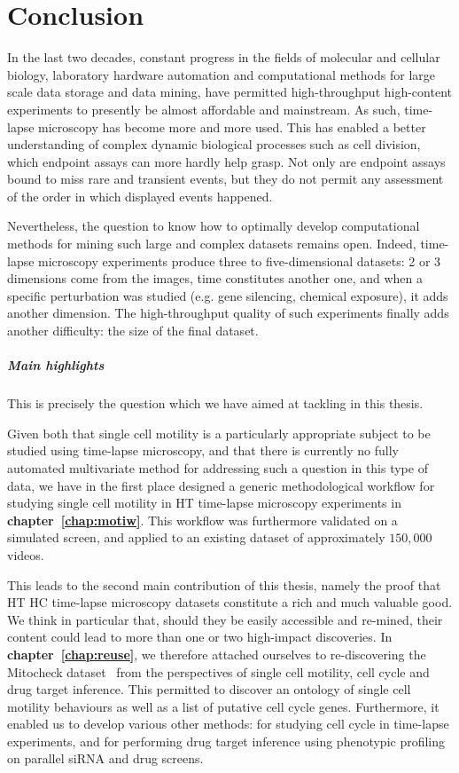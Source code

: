 \chapter{Conclusion}

In the last two decades, constant progress in the fields of molecular and cellular biology, laboratory hardware automation and computational methods for large scale data storage and data mining, have permitted high-throughput high-content experiments to presently be almost affordable and mainstream. As such, time-lapse microscopy has become more and more used. This has enabled a better understanding of complex dynamic biological processes such as cell division, which endpoint assays can more hardly help grasp. Not only are endpoint assays bound to miss rare and transient events, but they do not permit any assessment of the order in which displayed events happened.

Nevertheless, the question to know how to optimally develop computational methods for mining such large and complex datasets remains open. Indeed, time-lapse microscopy experiments produce three to five-dimensional datasets: 2 or 3 dimensions come from the images, time constitutes another one, and when a specific perturbation was studied (e.g. gene silencing, chemical exposure), it adds another dimension. The high-throughput quality of such experiments finally adds another difficulty: the size of the final dataset.

\paragraph*{Main highlights\\}
This is precisely the question which we have aimed at tackling in this thesis.

Given both that single cell motility is a particularly appropriate subject to be studied using time-lapse microscopy, and that there is currently no fully automated multivariate method for addressing such a question in this type of data, we have in the first place designed a generic methodological workflow for studying single cell motility in HT time-lapse microscopy experiments in \textbf{chapter~\ref{chap:motiw}}. This workflow was furthermore validated on a simulated screen, and applied to an existing dataset of approximately $150,000$ videos.

This leads to the second main contribution of this thesis, namely the proof that HT HC time-lapse microscopy datasets constitute a rich and much valuable good. We think in particular that, should they be easily accessible and re-mined, their content could lead to more than one or two high-impact discoveries. In \textbf{chapter~\ref{chap:reuse}}, we therefore attached ourselves to re-discovering the Mitocheck dataset~\cite{pmid20360735} from the perspectives of single cell motility, cell cycle and drug target inference. This permitted to discover an ontology of single cell motility behaviours as well as a list of putative cell cycle genes. Furthermore, it enabled us to develop various other methods: for studying cell cycle in time-lapse experiments, and for performing drug target inference using phenotypic profiling on parallel siRNA and drug screens.

